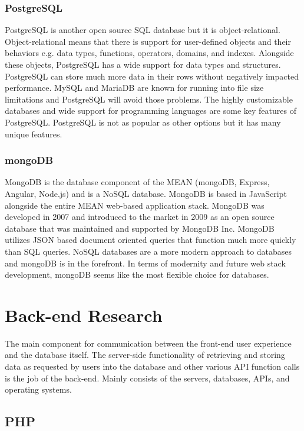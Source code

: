 \documentclass[12pt]{report}
\begin{document}
\subsubsection*{PostgreSQL}

PostgreSQL is another open source SQL database but it is object-relational.  Object-relational means that there is support for user-defined objects and their behaviors e.g. data types, functions, operators, domains, and indexes.  Alongside these objects, PostgreSQL has a wide support for data types and structures.  PostgreSQL can store much more data in their rows without negatively impacted performance.  MySQL and MariaDB are known for running into file size limitations and PostgreSQL will avoid those problems.  The highly customizable databases and wide support for programming languages are some key features of PostgreSQL.  PostgreSQL is not as popular as other options but it has many unique features.

\subsubsection*{mongoDB}

MongoDB is the database component of the MEAN (mongoDB, Express, Angular, Node.js) and is a NoSQL database.  MongoDB is based in JavaScript alongside the entire MEAN web-based application stack.  MongoDB was developed in 2007 and introduced to the market in 2009 as an open source database that was maintained and supported by MongoDB Inc.  MongoDB utilizes JSON based document oriented queries that function much more quickly than SQL queries.  NoSQL databases are a more modern approach to databases and mongoDB is in the forefront.  In terms of modernity and future web stack development, mongoDB seems like the most flexible choice for databases.  

\section*{Back-end Research}

The main component for communication between the front-end user experience and the database itself.  The server-side functionality of retrieving and storing data as requested by users into the database and other various API function calls is the job of the back-end.  Mainly consists of the servers, databases, APIs, and operating systems.      

\subsection*{PHP}
\end{document}
